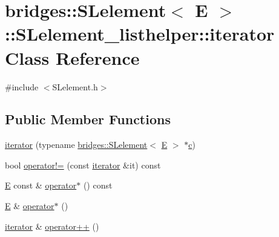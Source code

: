 \hypertarget{classbridges_1_1_s_lelement_1_1_s_lelement__listhelper_1_1iterator}{}\section{bridges\+:\+:S\+Lelement$<$ E $>$\+:\+:S\+Lelement\+\_\+listhelper\+:\+:iterator Class Reference}
\label{classbridges_1_1_s_lelement_1_1_s_lelement__listhelper_1_1iterator}


{\ttfamily \#include $<$S\+Lelement.\+h$>$}

\subsection*{Public Member Functions}
\begin{DoxyCompactItemize}
\item 
\hyperlink{classbridges_1_1_s_lelement_1_1_s_lelement__listhelper_1_1iterator_a7699b38922ea4088820413ee5ad0b165}{iterator} (typename \hyperlink{classbridges_1_1_s_lelement}{bridges\+::\+S\+Lelement}$<$ \hyperlink{namespacebridges_acfb0a4f7877d8f63de3e6862004c50eda3a3ea00cfc35332cedf6e5e9a32e94da}{E} $>$ $\ast$\hyperlink{namespacebridges_acfb0a4f7877d8f63de3e6862004c50eda4a8a08f09d37b73795649038408b5f33}{c})
\item 
bool \hyperlink{classbridges_1_1_s_lelement_1_1_s_lelement__listhelper_1_1iterator_ac39a33029eb4ebbed3d0992a9fda1c9a}{operator!=} (const \hyperlink{classbridges_1_1_s_lelement_1_1_s_lelement__listhelper_1_1iterator}{iterator} \&it) const
\item 
\hyperlink{namespacebridges_acfb0a4f7877d8f63de3e6862004c50eda3a3ea00cfc35332cedf6e5e9a32e94da}{E} const  \& \hyperlink{classbridges_1_1_s_lelement_1_1_s_lelement__listhelper_1_1iterator_a29db05550a69e20bec4627d36c5e31c2}{operator$\ast$} () const
\item 
\hyperlink{namespacebridges_acfb0a4f7877d8f63de3e6862004c50eda3a3ea00cfc35332cedf6e5e9a32e94da}{E} \& \hyperlink{classbridges_1_1_s_lelement_1_1_s_lelement__listhelper_1_1iterator_aa4278871d939b261e8871ad95cb09756}{operator$\ast$} ()
\item 
\hyperlink{classbridges_1_1_s_lelement_1_1_s_lelement__listhelper_1_1iterator}{iterator} \& \hyperlink{classbridges_1_1_s_lelement_1_1_s_lelement__listhelper_1_1iterator_acc2e5d9cba1b837897c0ff8d42618d3a}{operator++} ()
\end{DoxyCompactItemize}



